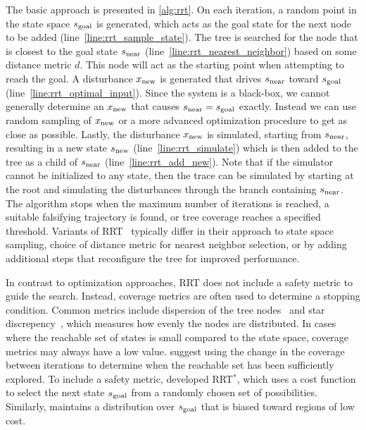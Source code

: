 The basic approach is presented in \cref{alg:rrt}. On each iteration, a random point in the state space $s_{\rm goal}$ is generated, which acts as the goal state for the next node to be added (line~\ref{line:rrt_sample_state}). The tree is searched for the node that is closest to the goal state $s_{\rm near}$ (line~\ref{line:rrt_nearest_neighbor}) based on some distance metric $d$.  This node will act as the starting point when attempting to reach the goal. A disturbance $x_{\rm new}$ is generated that drives $s_{\rm near}$ toward $s_{\rm goal}$ (line~\ref{line:rrt_optimal_input}). Since the system is a black-box, we cannot generally determine an $x_{\rm new}$ that causes $s_{\rm near} = s_{\rm goal}$ exactly. Instead we can use random sampling of $x_{\rm new}$ or a more advanced optimization procedure to get as close as possible. Lastly, the disturbance $x_{\rm new}$ is simulated, starting from $s_{\rm near}$, resulting in a new state $s_{\rm new}$ (line~\ref{line:rrt_simulate}) which is then added to the tree as a child of $s_{\rm near}$ (line~\ref{line:rrt_add_new}). Note that if the simulator cannot be initialized to any state, then the trace can be simulated by starting at the root and simulating the disturbances through the branch containing $s_{\rm near}$. The algorithm stops when the maximum number of iterations is reached, a suitable falsifying trajectory is found, or tree coverage reaches a specified threshold. Variants of RRT~\cite{esposito2004adaptive,kim2005rrt,branicky2006sampling,dang2008sensitive,Nahhal2007Test,dreossi2015efficient,tuncali2019rapidly,koschi2019computationally} typically differ in their approach to state space sampling, choice of distance metric for nearest neighbor selection, or by adding additional steps that reconfigure the tree for improved performance.

In contrast to optimization approaches, RRT does not include a safety metric to guide the search. Instead, coverage metrics are often used to determine a stopping condition. Common metrics include dispersion of the tree nodes~\cite{esposito2004adaptive} and star discrepency~\cite{Nahhal2007Test,dang2008sensitive,dreossi2015efficient}, which measures how evenly the nodes are distributed. In cases where the reachable set of states is small compared to the state space, coverage metrics may always have a low value. \textcite{esposito2004adaptive} suggest using the change in the coverage between iterations to determine when the reachable set has been sufficiently explored. To include a safety metric, \textcite{karaman2011sampling} developed RRT$^*$, which uses a cost function to select the next state $s_{\rm goal}$ from a randomly chosen set of possibilities. Similarly, \textcite{kim2005rrt} maintains a distribution over $s_{\rm goal}$ that is biased toward regions of low cost. 


